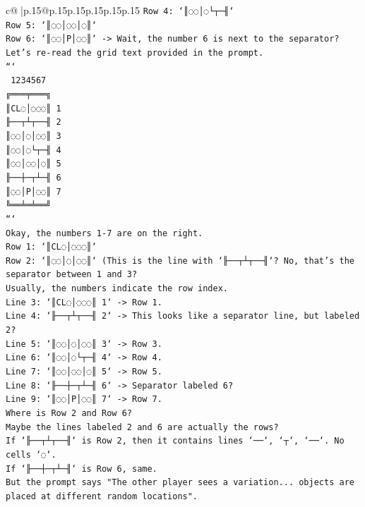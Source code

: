 \documentclass{article}
\begin{document}
{\begin{supertabular}{c@{$\;$}|p{.15\linewidth}@{}p{.15\linewidth}p{.15\linewidth}p{.15\linewidth}p{.15\linewidth}p{.15\linewidth}}
{{{\texttt{Row 4: `║◌◌│◌└┬─╢`} \\
\texttt{Row 5: `║◌◌│◌◌│◌║`} \\
\texttt{Row 6: `║◌◌│P│◌◌║` {-}> Wait, the number 6 is next to the separator?} \\
\texttt{Let's re{-}read the grid text provided in the prompt.} \\
\texttt{```} \\
\texttt{ 1234567} \\
\texttt{╔═══╤═══╗} \\
\texttt{║CL◌│◌◌◌║ 1} \\
\texttt{╟──┬┴┬──╢ 2} \\
\texttt{║◌◌│◌│◌◌║ 3} \\
\texttt{║◌◌│◌└┬─╢ 4} \\
\texttt{║◌◌│◌◌│◌║ 5} \\
\texttt{╟──┼─┬┴─╢ 6} \\
\texttt{║◌◌│P│◌◌║ 7} \\
\texttt{╚══╧═╧══╝} \\
\texttt{```} \\
\texttt{Okay, the numbers 1{-}7 are on the right.} \\
\texttt{Row 1: `║CL◌│◌◌◌║`} \\
\texttt{Row 2: `║◌◌│◌│◌◌║` (This is the line with `╟──┬┴┬──╢`? No, that's the separator between 1 and 3?} \\
\texttt{Usually, the numbers indicate the row index.} \\
\texttt{Line 3: `║CL◌│◌◌◌║ 1` {-}> Row 1.} \\
\texttt{Line 4: `╟──┬┴┬──╢ 2` {-}> This looks like a separator line, but labeled 2?} \\
\texttt{Line 5: `║◌◌│◌│◌◌║ 3` {-}> Row 3.} \\
\texttt{Line 6: `║◌◌│◌└┬─╢ 4` {-}> Row 4.} \\
\texttt{Line 7: `║◌◌│◌◌│◌║ 5` {-}> Row 5.} \\
\texttt{Line 8: `╟──┼─┬┴─╢ 6` {-}> Separator labeled 6?} \\
\texttt{Line 9: `║◌◌│P│◌◌║ 7` {-}> Row 7.} \\
\texttt{Where is Row 2 and Row 6?} \\
\texttt{Maybe the lines labeled 2 and 6 are actually the rows?} \\
\texttt{If `╟──┬┴┬──╢` is Row 2, then it contains lines `──`, `┬`, `──`. No cells `◌`.} \\
\texttt{If `╟──┼─┬┴─╢` is Row 6, same.} \\
\texttt{But the prompt says "The other player sees a variation... objects are placed at different random locations".} \\
}}}
\end{supertabular}}
\end{document}
